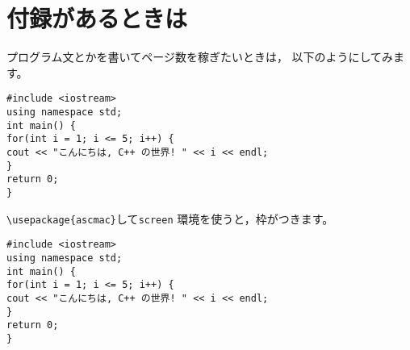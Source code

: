 \documentclass[a4paper,12pt]{jreport}
\begin{document}
\appendix
\chapter{付録があるときは}
プログラム文とかを書いてページ数を稼ぎたいときは，
以下のようにしてみます。

\begin{verbatim}
#include <iostream>
using namespace std;
int main() {
for(int i = 1; i <= 5; i++) {
cout << "こんにちは, C++ の世界! " << i << endl;
}
return 0;
}
\end{verbatim}
\verb|\usepackage{ascmac}|して\verb|screen| 環境を使うと，枠がつきます。
\begin{screen}
\begin{verbatim}
#include <iostream>
using namespace std;
int main() {
for(int i = 1; i <= 5; i++) {
cout << "こんにちは, C++ の世界! " << i << endl;
}
return 0;
}
\end{verbatim}
\end{screen}
\end{document}
